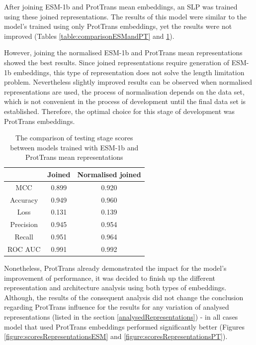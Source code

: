 \documentclass[12pt]{article}
\begin{document}
	After joining ESM-1b and ProtTrans mean embeddings, an SLP was trained 
	using these joined representations. The results of this model were similar 
	to the model's trained using only ProtTrans embeddings, yet the results 
	were not improved (Tables \ref{table:comparisonESMandPT} and 
	\ref{table:comparisonJoinedAndJoinedNorm}). 

	However, joining the normalised ESM-1b and ProtTrans mean representations 
	showed the best results. Since joined representations require
	generation of ESM-1b embeddings, this type of representation does not 
	solve the length limitation problem. Nevertheless 
	slightly improved results can be observed when normalised representations 
	are used, the process of normalisation depends on the data set, which is 
	not convenient in the process of development until the final data set 
	is established. Therefore, the optimal choice for this stage of 
	development was ProtTrans embeddings.

	\begin{table}[h!]
		\caption{The comparison of testing stage scores between 
		models trained with ESM-1b and ProtTrans mean 
		representations}
		\vspace{0.2cm}
		\centering
		\begin{tabular}{ | c | c c | }
			\hline 
						
			& Joined & Normalised joined \\
			\hline 
			MCC & 0.899 & 0.920 \\
			Accuracy & 0.949 & 0.960 \\
			Loss & 0.131 & 0.139 \\
			Precision & 0.945 & 0.954 \\
			Recall & 0.951 & 0.964 \\
			ROC AUC & 0.991 & 0.992 \\
			\hline    
		\end{tabular}
		\label{table:comparisonJoinedAndJoinedNorm}
	\end{table}

	Nonetheless, ProtTrans already demonstrated the impact for the 
	model's improvement of performance, it was decided to finish up 
	the different representation and architecture analysis using both 
	types of embeddings. Although, the results of the consequent analysis 
	did not change the conclusion regarding ProtTrans influence for the 
	results for any variation of analysed representations (listed in the
	section \ref{analysedRepresentations}) - in all cases model that used 
	ProtTrans embeddings performed significantly better (Figures 
	\ref{figure:scoresRepresentationsESM} and 
	\ref{figure:scoresRepresentationsPT}).
\end{document}

